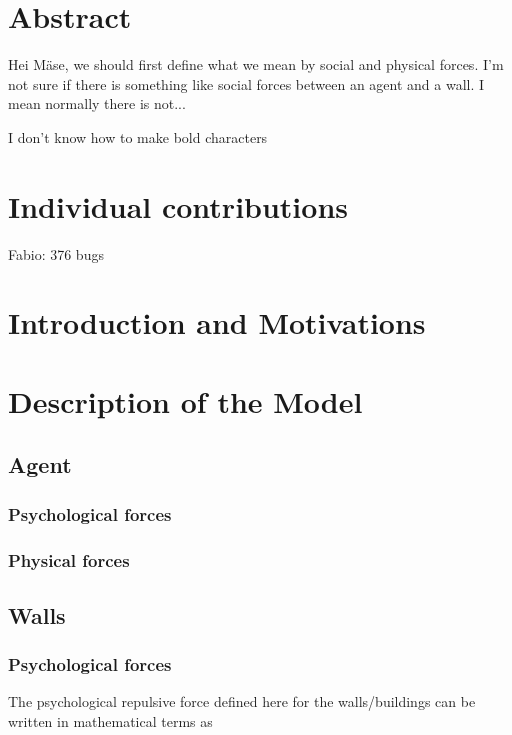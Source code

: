 \documentclass[11pt]{article}
\begin{document}
\newpage




\section{Abstract}

Hei M\"ase, we should first define what we mean by social and physical forces. I'm not sure if there is something like social forces between an agent and a wall. I mean normally there is not...

I don't know how to make bold characters

\section{Individual contributions}

Fabio: 376 bugs

\section{Introduction and Motivations}

\section{Description of the Model}

\subsection{Agent}
\subsubsection{Psychological forces}

\subsubsection{Physical forces}


\subsection{Walls}

\subsubsection{Psychological forces}

The psychological repulsive force defined here for the walls/buildings can be written in mathematical terms as
\end{document}
